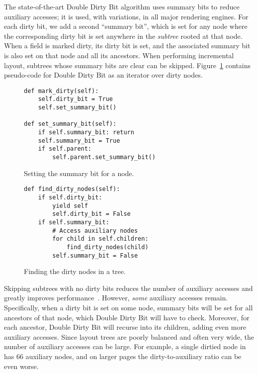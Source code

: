The state-of-the-art Double Dirty Bit algorithm
  uses summary bits to reduce auxiliary accesses;
  it is used, with variations, in all major rendering engines.
For each dirty bit, we add a second ``summary bit'',
  which is set for any node where the corresponding dirty bit
  is set anywhere in the \emph{subtree} rooted at that node.
When a field is marked dirty, its dirty bit is set,
  and the associated summary bit is also set
  on that node and all its ancestors.
When performing incremental layout,
  subtrees whose summary bits are clear can be skipped.
Figure~\ref{fig:find-dirty-nodes} contains
  pseudo-code for Double Dirty Bit
  as an iterator over dirty nodes.

\begin{figure}
\begin{minipage}[b]{0.5\linewidth}
\begin{verbatim}
def mark_dirty(self):
    self.dirty_bit = True
    self.set_summary_bit()

def set_summary_bit(self):
    if self.summary_bit: return
    self.summary_bit = True
    if self.parent:
        self.parent.set_summary_bit()
\end{verbatim}
\caption{Setting the summary bit for a node.}
\label{fig:set-summary-bits}
\end{minipage}\hfill%
\begin{minipage}[b]{0.5\linewidth}
\begin{verbatim}
def find_dirty_nodes(self):
    if self.dirty_bit:
        yield self
        self.dirty_bit = False
    if self.summary_bit:
        # Access auxiliary nodes
        for child in self.children:
            find_dirty_nodes(child)
        self.summary_bit = False
\end{verbatim}
\caption{Finding the dirty nodes in a tree.}
\label{fig:find-dirty-nodes}
\end{minipage}
\end{figure}

Skipping subtrees with no dirty bits
  reduces the number of auxiliary accesses
  and greatly improves performance~\cite{tali-garseil,wbe}.
However, \emph{some} auxiliary accesses remain.
Specifically, when a dirty bit is set on some node,
  summary bits will be set for all ancestors of that node,
  which Double Dirty Bit will have to check.
Moreover, for each ancestor,
  Double Dirty Bit will recurse into its children,
  adding even more auxiliary accesses.
Since layout trees are poorly balanced and often very wide,
  the number of auxiliary accesses can be large.
For example,
  a single dirtied node in  has 66 auxiliary nodes,
  and on larger pages the dirty-to-auxiliary ratio can be even worse.

